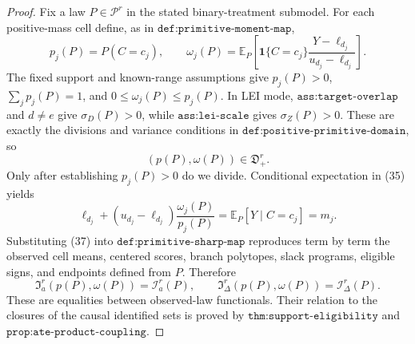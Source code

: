 \documentclass{article}
\begin{document}
\begin{proof}
Fix a law \(P\in\mathcal P^r\) in the stated binary-treatment submodel.  For each positive-mass cell define, as in \(\texttt{def:primitive-moment-map}\),
\[
 p_j(P)=P(C=c_j),\qquad
 \omega_j(P)=\mathbb E_P\!\left[
 \mathbf 1\{C=c_j\}\frac{Y-\ell_{d_j}}{u_{d_j}-\ell_{d_j}}
 \right].                                                                     \tag{35}
\]
The fixed support and known-range assumptions give \(p_j(P)>0\), \(\sum_jp_j(P)=1\), and \(0\le\omega_j(P)\le p_j(P)\).  In LEI mode, \(\texttt{ass:target-overlap}\) and \(d\ne e\) give \(\sigma_D(P)>0\), while \(\texttt{ass:lei-scale}\) gives \(\sigma_Z(P)>0\).  These are exactly the divisions and variance conditions in \(\texttt{def:positive-primitive-domain}\), so
\[
 (p(P),\omega(P))\in\mathfrak D_+^r.                                         \tag{36}
\]
Only after establishing \(p_j(P)>0\) do we divide.  Conditional expectation in (35) yields
\[
 \ell_{d_j}+(u_{d_j}-\ell_{d_j})\frac{\omega_j(P)}{p_j(P)}
 =\mathbb E_P[Y\mid C=c_j]=m_j.                                               \tag{37}
\]
Substituting (37) into \(\texttt{def:primitive-sharp-map}\) reproduces term by term the observed cell means, centered scores, branch polytopes, slack programs, eligible signs, and endpoints defined from \(P\).  Therefore
\[
 \mathfrak I_a^r(p(P),\omega(P))=\mathcal I_a^r(P),\qquad
 \mathfrak I_\Delta^r(p(P),\omega(P))=\mathcal I_\Delta^r(P).               \tag{38}
\]
These are equalities between observed-law functionals.  Their relation to the closures of the causal identified sets is proved by \(\texttt{thm:support-eligibility}\) and \(\texttt{prop:ate-product-coupling}\).


\end{proof}
\end{document}
